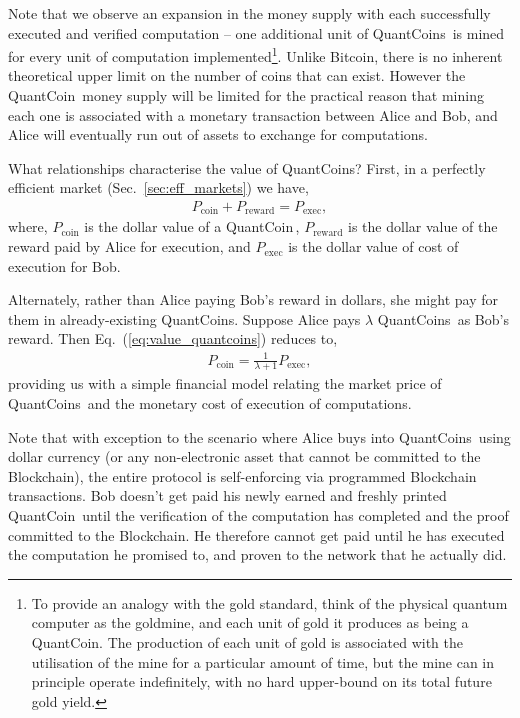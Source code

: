 Note that we observe an expansion in the money supply with each successfully executed and verified computation -- one additional unit of QuantCoins\texttrademark\, is mined for every unit of computation implemented\footnote{To provide an analogy with the gold standard, think of the physical quantum computer as the goldmine, and each unit of gold it produces as being a QuantCoin\texttrademark. The production of each unit of gold is associated with the utilisation of the mine for a particular amount of time, but the mine can in principle operate indefinitely, with no hard upper-bound on its total future gold yield.}. Unlike Bitcoin, there is no inherent theoretical upper limit on the number of coins that can exist. However the QuantCoin\texttrademark\, money supply will be limited for the practical reason that mining each one is associated with a monetary transaction between Alice and Bob, and Alice will eventually run out of assets to exchange for computations.

What relationships characterise the value of QuantCoins\texttrademark? First, in a perfectly efficient market (Sec.~\ref{sec:eff_markets}) we have,
\begin{align}\label{eq:value_quantcoins}
	P_\mathrm{coin} + P_\mathrm{reward} = P_\mathrm{exec},
\end{align}
where, 
$P_\mathrm{coin}$ is the dollar value of a QuantCoin\texttrademark\,, $P_\mathrm{reward}$ is the dollar value of the reward paid by Alice for execution, and $P_\mathrm{exec}$ is the dollar value of cost of execution for Bob.
 
Alternately, rather than Alice paying Bob's reward in dollars, she might pay for them in already-existing QuantCoins\texttrademark. Suppose Alice pays $\lambda$ QuantCoins\texttrademark\, as Bob's reward. Then Eq.~(\ref{eq:value_quantcoins}) reduces to,
\begin{align}
P_\mathrm{coin} =\frac{1}{\lambda+1}P_\mathrm{exec},
\end{align}
providing us with a simple financial model relating the market price of QuantCoins\texttrademark\, and the monetary cost of execution of computations.

Note that with exception to the scenario where Alice buys into QuantCoins\texttrademark\, using dollar currency (or any non-electronic asset that cannot be committed to the Blockchain), the entire protocol is self-enforcing via programmed Blockchain transactions. Bob doesn't get paid his newly earned and freshly printed QuantCoin\texttrademark\, until the verification of the computation has completed and the proof committed to the Blockchain. He therefore cannot get paid until he has executed the computation he promised to, and proven to the network that he actually did.


